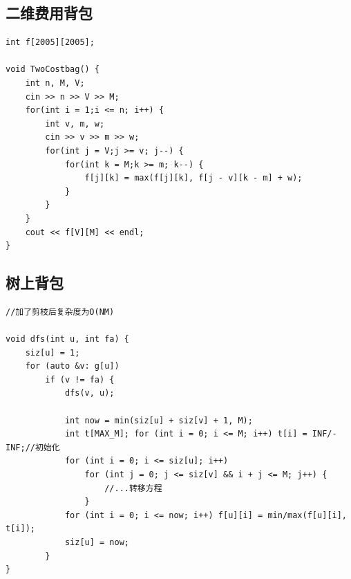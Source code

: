 \documentclass[twoside]{article}
\begin{document}
\subsection{二维费用背包}
\begin{lstlisting}
int f[2005][2005];

void TwoCostbag() {
    int n, M, V;
    cin >> n >> V >> M;
    for(int i = 1;i <= n; i++) {
        int v, m, w;
        cin >> v >> m >> w;
        for(int j = V;j >= v; j--) {
            for(int k = M;k >= m; k--) {
                f[j][k] = max(f[j][k], f[j - v][k - m] + w);
            }
        }
    }
    cout << f[V][M] << endl;
}

\end{lstlisting}
\subsection{树上背包}
\begin{lstlisting}
//加了剪枝后复杂度为O(NM)

void dfs(int u, int fa) {
    siz[u] = 1;
    for (auto &v: g[u])
        if (v != fa) {
            dfs(v, u);

            int now = min(siz[u] + siz[v] + 1, M);
            int t[MAX_M]; for (int i = 0; i <= M; i++) t[i] = INF/-INF;//初始化
            for (int i = 0; i <= siz[u]; i++)
                for (int j = 0; j <= siz[v] && i + j <= M; j++) {
                    //...转移方程
                }
            for (int i = 0; i <= now; i++) f[u][i] = min/max(f[u][i], t[i]);
            siz[u] = now;
        }
}
\end{lstlisting}
\end{document}
